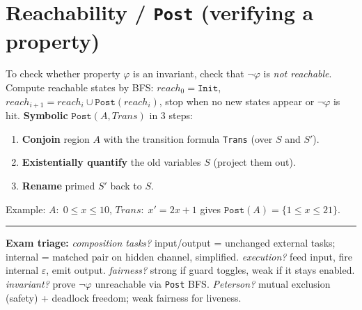 \section{Reachability / \texttt{Post} (verifying a property)}
To check whether property $\varphi$ is an invariant, check that $\neg\varphi$ is \emph{not reachable}. Compute reachable states by BFS: $reach_0 = \texttt{Init}$, $reach_{i+1}=reach_i \cup \texttt{Post}(reach_i)$, stop when no new states appear or $\neg\varphi$ is hit. \textbf{Symbolic} $\texttt{Post}(A,Trans)$ in 3 steps:
\begin{enumerate}
  \item \textbf{Conjoin} region $A$ with the transition formula \texttt{Trans} (over $S$ and $S'$).
  \item \textbf{Existentially quantify} the old variables $S$ (project them out).
  \item \textbf{Rename} primed $S'$ back to $S$.
\end{enumerate}
Example: $A:\;0\le x\le 10$, $Trans:\;x'=2x+1$ gives $\texttt{Post}(A)=\{1\le x\le 21\}$.

\vspace{4pt}
\hrule
\vspace{2pt}
{\footnotesize\textbf{Exam triage:} \emph{composition tasks?} input/output = unchanged external tasks; internal = matched pair on hidden channel, simplified. \emph{execution?} feed input, fire internal $\varepsilon$, emit output. \emph{fairness?} strong if guard toggles, weak if it stays enabled. \emph{invariant?} prove $\neg\varphi$ unreachable via \texttt{Post} BFS. \emph{Peterson?} mutual exclusion (safety) + deadlock freedom; weak fairness for liveness.}
